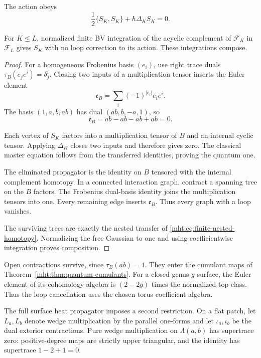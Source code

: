 \begin{theorem}\label{mht:thm:finite-torus-qme}
The action obeys
\[
 \frac12\{S_K,S_K\}+\hbar\Delta_KS_K=0.
\]

For $K\le L$, normalized finite BV integration of the acyclic
complement of $\mathcal F_K$ in $\mathcal F_L$ gives $S_K$ with
no loop correction to its action. These integrations compose.
\end{theorem}

\begin{proof}
For a homogeneous Frobenius basis $(e_i)$, use right trace duals
$\tau_B(e_je^i)=\delta_j^i$. Closing two inputs of a multiplication
tensor inserts the Euler element
\[
 \mathfrak e_B=\sum_i(-1)^{|e_i|}e_ie^i.
\]
The basis $(1,a,b,ab)$ has dual $(ab,b,-a,1)$, so
\begin{equation}\label{mht:eq:torus-euler-element}
 \mathfrak e_B=ab-ab-ab+ab=0.
\end{equation}

Each vertex of $S_K$ factors into a multiplication tensor of $B$
and an internal cyclic tensor. Applying $\Delta_K$ closes two
inputs and therefore gives zero. The classical master equation
follows from the transferred identities, proving the quantum one.

The eliminated propagator is the identity on $B$ tensored with
the internal complement homotopy. In a connected interaction graph,
contract a spanning tree on the $B$ factors. The Frobenius dual-basis
identity joins the multiplication tensors into one. Every remaining
edge inserts $\mathfrak e_B$. Thus every graph with a loop vanishes.

The surviving trees are exactly the nested transfer of
\eqref{mht:eq:finite-nested-homotopy}. Normalizing the free Gaussian
to one and using coefficientwise integration proves composition.
\end{proof}

Open contractions survive, since $\tau_B(ab)=1$. They enter the
cumulant maps of Theorem~\ref{mht:thm:quantum-cumulants}.
For a closed genus-$g$ surface, the Euler element of its cohomology
algebra is $(2-2g)$ times the normalized top class. Thus the loop
cancellation uses the chosen torus coefficient algebra.

The full surface heat propagator imposes a second restriction.
On a flat patch, let $L_a,L_b$ denote wedge multiplication by the
parallel one-forms and let $\iota_a,\iota_b$ be the dual exterior
contractions. Pure wedge multiplication on $\Lambda(a,b)$ has
supertrace zero: positive-degree maps are strictly upper triangular,
and the identity has supertrace $1-2+1=0$.

